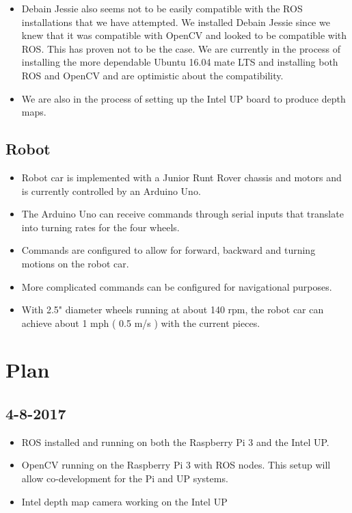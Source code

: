 \documentclass[11pt]{amsart}
\begin{document}
\begin{itemize}
\item Debain Jessie also seems not to be easily compatible with the ROS installations that we have attempted.  We installed Debain Jessie since we knew that it was compatible with OpenCV and looked to be compatible with ROS.  This has proven not to be the case.  We are currently in the process of installing the more dependable Ubuntu 16.04 mate LTS and installing both ROS and OpenCV and are optimistic about the compatibility.
\item We are also in the process of setting up the Intel UP board to produce depth maps.
\end{itemize}

\subsection{Robot}
\begin{itemize}
\item Robot car is implemented with a Junior Runt Rover chassis and motors and is currently controlled by an Arduino Uno.
\item The Arduino Uno can receive commands through serial inputs that translate into turning rates for the four wheels.
\item Commands are configured to allow for forward, backward and turning motions on the robot car.
\item More complicated commands can be configured for navigational purposes.
\item With 2.5" diameter wheels running at about 140 rpm, the robot car can achieve about 1 mph ( 0.5 m/s ) with the current pieces.
\end{itemize}

\section{Plan}
\subsection*{4-8-2017}
\begin{itemize}
\item ROS installed and running on both the Raspberry Pi 3 and the Intel UP.
\item OpenCV running on the Raspberry Pi 3 with ROS nodes. This setup will allow co-development for the Pi and UP systems.
\item Intel depth map camera working on the Intel UP
\end{itemize}
\end{document}
